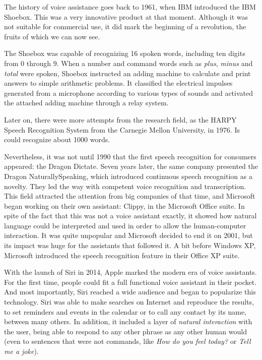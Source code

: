 The history of voice assistance goes back to 1961, when IBM introduced the IBM Shoebox.\cite{voicebotTimeline}
This was a very innovative product at that moment. Although it was not suitable for commercial use, it did mark the
beginning of a revolution, the fruits of which we can now see.

The Shoebox was capable of recognizing 16 spoken words, including ten digits from 0 through 9. When a number and
command words such as \textit{plus}, \textit{minus} and \textit{total} were spoken, Shoebox instructed an adding machine
to calculate and print answers to simple arithmetic problems. It classified the electrical impulses generated from a microphone
according to various types of sounds and activated the attached adding machine through a relay system.\cite{ibmArchivesShoebox}

Later on, there were more attempts from the research field, as the HARPY Speech Recognition System from the Carnegie
Mellon University, in 1976.\cite{lowerre76} Is could recognize about 1000 words.

Nevertheless, it was not until 1990 that the first speech recognition for consumers appeared: the Dragon Dictate. Seven years
later, the same company presented the Dragon NaturallySpeaking, which introduced continuous speech recognition as a novelty.
They led the way with competent voice recognition and transcription. This field attracted the attention from big companies of that
time, and Microsoft began working on their own assistant: Clippy, in the Microsoft Office suite. In spite of the fact that this was
not a voice assistant exactly, it showed how natural language could be interpreted and used in order to allow the human-computer
interaction. It was quite unpopular and Microsoft decided to end it on 2001, but its impact was huge for the assistants that followed
it. A bit before Windows XP, Microsoft introduced the speech recognition feature in their Office XP suite.

With the launch of Siri in 2014, Apple marked the modern era of voice assistants. For the first time, people could fit a full functional
voice assistant in their pocket. And most importantly, Siri reached a wide audience and began to popularize this technology.
Siri was able to make searches on Internet and reproduce the results, to set reminders and events in the calendar or to call any
contact by its name, between many others. In addition, it included a layer of \textit{natural interaction} with the user, being able to
respond to any other phrase as any other human would (even to sentences that were not commands, like \textit{How do you feel
today?} or \textit{Tell me a joke}).

